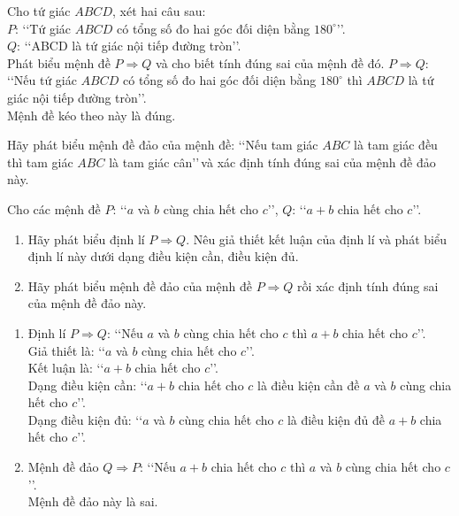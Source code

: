\begin{bt}%
	Cho tứ giác $ABCD$, xét hai câu sau:\\
	$P$: \lq\lq Tứ giác $ABCD$ có tổng số đo hai góc đối diện bằng $180^\circ$\rq\rq. \\
	$Q$: \lq\lq ABCD là tứ giác nội tiếp đường tròn\rq\rq.\\
	Phát biểu mệnh đề $P \Rightarrow Q$ và cho biết tính đúng sai của mệnh đề đó.
	\loigiai
	{$P \Rightarrow Q$: \lq\lq Nếu tứ giác $ABCD$ có tổng số đo hai góc đối diện bằng $180^\circ$ thì $ABCD$ là tứ giác nội tiếp đường tròn\rq\rq.\\
		Mệnh đề kéo theo này là đúng.}
\end{bt}

\begin{bt}%
	Hãy phát biểu mệnh đề đảo của mệnh đề: \lq\lq Nếu tam giác $ABC$ là tam giác đều thì tam giác $ABC$ là tam giác cân\rq\rq\,và xác định tính đúng sai của mệnh đề đảo này.
\end{bt}

\begin{bt}%
	Cho các mệnh đề $P$: \lq\lq $a$ và $b$ cùng chia hết cho $c$\rq\rq, $Q$: \lq\lq $a+b$ chia hết cho $c$\rq\rq. 
	\begin{enumerate}
		\item Hãy phát biểu định lí $P \Rightarrow Q$. Nêu giả thiết kết luận của định lí và phát biểu định lí này dưới dạng điều kiện cần, điều kiện đủ.
		\item Hãy phát biểu mệnh đề đảo của mệnh đề $P \Rightarrow Q$ rồi xác định tính đúng sai của mệnh đề đảo này.
	\end{enumerate}
	\loigiai 
	{
		\begin{enumerate}
			\item Định lí $P \Rightarrow Q$: \lq\lq Nếu $a$ và $b$ cùng chia hết cho $c$ thì $a+b$ chia hết cho $c$\rq\rq. \\
			Giả thiết là: \lq\lq $a$ và $b$ cùng chia hết cho $c$\rq\rq. \\
			Kết luận là: \lq\lq $a+b$ chia hết cho $c$\rq\rq. \\
			Dạng điều kiện cần: \lq\lq  $a+b$ chia hết cho $c$ là điều kiện cần đề $a$ và $b$ cùng chia hết cho $c$\rq\rq. \\
			Dạng điều kiện đủ: \lq\lq $a$ và $b$ cùng chia hết cho $c$ là điều kiện đủ đề  $a+b$ chia hết cho $c$\rq\rq. 
			\item Mệnh đề đảo $Q \Rightarrow P$: \lq\lq Nếu  $a+b$ chia hết cho $c$ thì  $a$ và $b$ cùng chia hết cho $c$\rq\rq. \\
			Mệnh đề đảo này là sai.
		\end{enumerate}
	}
\end{bt}

